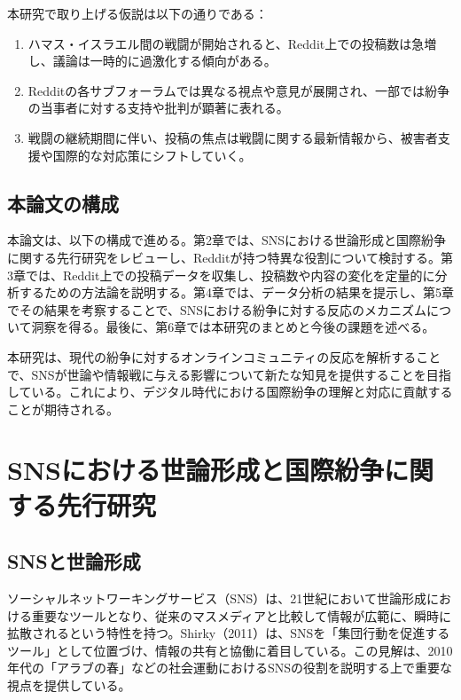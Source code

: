 \documentclass[11pt, a4j]{jreport}
\begin{document}
    本研究で取り上げる仮説は以下の通りである：

    \begin{enumerate}
        \item ハマス・イスラエル間の戦闘が開始されると、Reddit上での投稿数は急増し、議論は一時的に過激化する傾向がある。

        \item Redditの各サブフォーラムでは異なる視点や意見が展開され、一部では紛争の当事者に対する支持や批判が顕著に表れる。

        \item 戦闘の継続期間に伴い、投稿の焦点は戦闘に関する最新情報から、被害者支援や国際的な対応策にシフトしていく。
    \end{enumerate}

    \section{本論文の構成}
    本論文は、以下の構成で進める。第2章では、SNSにおける世論形成と国際紛争に関する先行研究をレビューし、Redditが持つ特異な役割について検討する。第3章では、Reddit上での投稿データを収集し、投稿数や内容の変化を定量的に分析するための方法論を説明する。第4章では、データ分析の結果を提示し、第5章でその結果を考察することで、SNSにおける紛争に対する反応のメカニズムについて洞察を得る。最後に、第6章では本研究のまとめと今後の課題を述べる。

    本研究は、現代の紛争に対するオンラインコミュニティの反応を解析することで、SNSが世論や情報戦に与える影響について新たな知見を提供することを目指している。これにより、デジタル時代における国際紛争の理解と対応に貢献することが期待される。

    \chapter{SNSにおける世論形成と国際紛争に関する先行研究}

    \section{SNSと世論形成}
    ソーシャルネットワーキングサービス（SNS）は、21世紀において世論形成における重要なツールとなり、従来のマスメディアと比較して情報が広範に、瞬時に拡散されるという特性を持つ。Shirky（2011）は、SNSを「集団行動を促進するツール」として位置づけ、情報の共有と協働に着目している。この見解は、2010年代の「アラブの春」などの社会運動におけるSNSの役割を説明する上で重要な視点を提供している。
\end{document}
